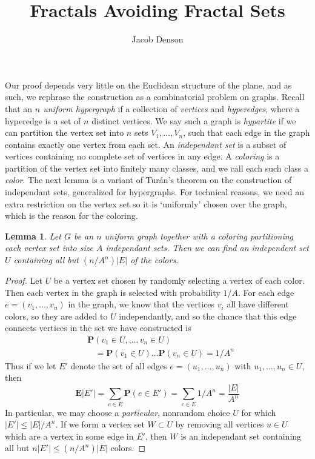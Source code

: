 \documentclass{article}
\title{Fractals Avoiding Fractal Sets}
\author{Jacob Denson}
\theoremstyle{plain}
\newtheorem{lemma}{Lemma}
\theoremstyle{plain}
\begin{document}
\maketitle

\begin{multicols}{2}

Our proof depends very little on the Euclidean structure of the plane, and as such, we rephrase the construction as a combinatorial problem on graphs. Recall that an {\it $n$ uniform hypergraph} if a collection of {\it vertices} and {\it hyperedges}, where a hyperedge is a set of $n$ distinct vertices. We say such a graph is {\it hypartite} if we can partition the vertex set into $n$ sets $V_1, \dots, V_n$, such that each edge in the graph contains exactly one vertex from each set. An {\it independant set} is a subset of vertices containing no complete set of vertices in any edge. A {\it coloring} is a partition of the vertex set into finitely many classes, and we call each such class a {\it color}. The next lemma is a variant of Tur\'{a}n's theorem on the construction of independant sets, generalized for hypergraphs. For technical reasons, we need an extra restriction on the vertex set so it is `uniformly' chosen over the graph, which is the reason for the coloring.

\begin{lemma}
	Let $G$ be an $n$ uniform graph together with a coloring partitioning each vertex set into size $A$ independant sets. Then we can find an independent set $U$ containing all but $(n/A^n)|E|$ of the colors.
\end{lemma}
\begin{proof}
	Let $U$ be a vertex set chosen by randomly selecting a vertex of each color. Then each vertex in the graph is selected with probability $1/A$. For each edge $e = (v_1, \dots, v_n)$ in the graph, we know that the vertices $v_i$ all have different colors, so they are added to $U$ independantly, and so the chance that this edge connects vertices in the set we have constructed is
	\begin{align*}
		&\mathbf{P}(v_1 \in U, \dots, v_n \in U)\\
		&\ \ \ \ = \mathbf{P}(v_1 \in U) \dots \mathbf{P}(v_n \in U) = 1/A^n
	\end{align*}
	Thus if we let $E'$ denote the set of all edges $e = (u_1, \dots, u_n)$ with $u_1, \dots, u_n \in U$, then
	\[ \mathbf{E}|E'| = \sum_{e \in E} \mathbf{P}(e \in E') = \sum_{e \in E} 1/A^n = \frac{|E|}{A^n} \]
	In particular, we may choose a {\it particular}, nonrandom choice $U$ for which $|E'| \leq |E|/A^n$. If we form a vertex set $W \subset U$ by removing all vertices $u \in U$ which are a vertex in some edge in $E'$, then $W$ is an independant set containing all but $n |E'| \leq (n/A^n) |E|$ colors.
\end{proof}


\end{multicols}
\end{document}
